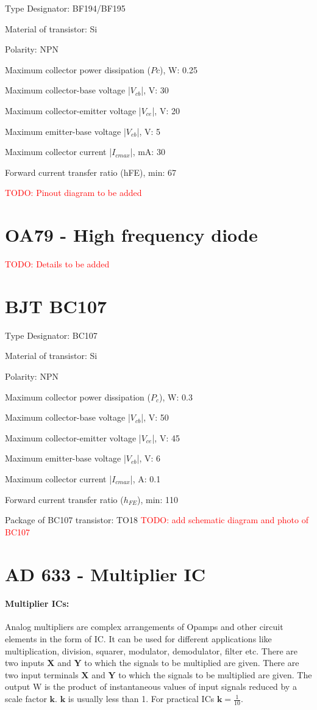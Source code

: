 Type Designator: BF194/BF195

Material of transistor: Si

Polarity: NPN

Maximum collector power dissipation ($Pc$), W: 0.25

Maximum collector-base voltage |$V_{cb}$|, V: 30

Maximum collector-emitter voltage |$V_{ce}$|, V: 20

Maximum emitter-base voltage |$V_{eb}$|, V: 5

Maximum collector current |$I_{c max}$|, mA: 30

Forward current transfer ratio (hFE), min: 67

\textcolor{red}{TODO: Pinout diagram to be added}

\section{OA79 - High frequency diode}
\textcolor{red}{TODO: Details to be added}
\section{BJT BC107}
\label{BC107}
Type Designator: BC107

Material of transistor: Si

Polarity: NPN

Maximum collector power dissipation ($P_c$), W: 0.3

Maximum collector-base voltage |$V_{cb}$|, V: 50

Maximum collector-emitter voltage |$V_{ce}$|, V: 45

Maximum emitter-base voltage |$V_{eb}$|, V: 6

Maximum collector current |$I_{cmax}$|, A: 0.1

Forward current transfer ratio ($h_{FE}$), min: 110

Package of BC107 transistor: TO18
\textcolor{red}{TODO: add schematic diagram and photo of BC107}



\section{AD 633 - Multiplier IC}
\label{AD633}
\paragraph{Multiplier ICs:}
 Analog multipliers are complex arrangements of Opamps and other circuit elements in the form of IC. It can be used for different applications like multiplication, division, squarer, modulator, demodulator, filter etc. There are two inputs $\textbf{X}$ and $\textbf{Y}$ to which the signals to be multiplied are given.
There are two input terminals $\textbf{X}$ and $\textbf{Y}$ to which the signals to be multiplied are given. The output W is the product of instantaneous values of input signals reduced by a scale factor $\textbf{k}$. $\textbf{k}$ is usually less than 1. For practical ICs $\textbf{k}=\frac{1}{10}$.

